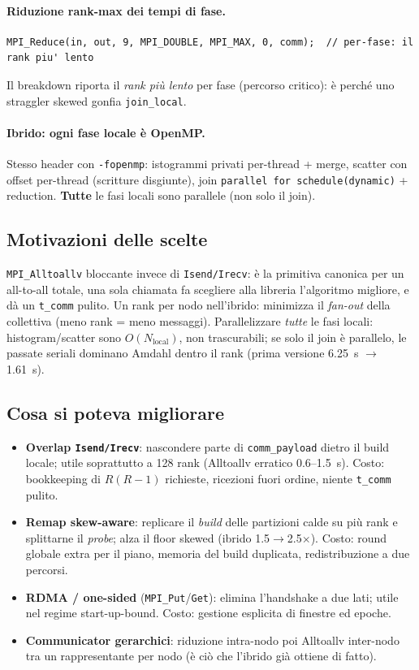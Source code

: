 \documentclass[11pt,a4paper]{article}
\begin{document}
\paragraph{Riduzione rank-max dei tempi di fase.}
\begin{lstlisting}[style=cpp]
MPI_Reduce(in, out, 9, MPI_DOUBLE, MPI_MAX, 0, comm);  // per-fase: il rank piu' lento
\end{lstlisting}
Il breakdown riporta il \emph{rank più lento} per fase (percorso critico): è perché uno straggler skewed gonfia \texttt{join\_local}.

\paragraph{Ibrido: ogni fase locale è OpenMP.} Stesso header con \texttt{-fopenmp}: istogrammi privati per-thread + merge, scatter con offset per-thread (scritture disgiunte), join \texttt{parallel for schedule(dynamic)} + reduction. \textbf{Tutte} le fasi locali sono parallele (non solo il join).

\subsection{Motivazioni delle scelte}

\texttt{MPI\_Alltoallv} bloccante invece di \texttt{Isend/Irecv}: è la primitiva canonica per un all-to-all totale, una sola chiamata fa scegliere alla libreria l'algoritmo migliore, e dà un \texttt{t\_comm} pulito. Un rank per nodo nell'ibrido: minimizza il \emph{fan-out} della collettiva (meno rank = meno messaggi). Parallelizzare \emph{tutte} le fasi locali: histogram/scatter sono $O(N_\text{local})$, non trascurabili; se solo il join è parallelo, le passate seriali dominano Amdahl dentro il rank (prima versione 6.25~s $\to$ 1.61~s).

\subsection{Cosa si poteva migliorare}

\begin{itemize}
  \item \textbf{Overlap \texttt{Isend/Irecv}}: nascondere parte di \texttt{comm\_payload} dietro il build locale; utile soprattutto a 128 rank (Alltoallv erratico 0.6--1.5~s). Costo: bookkeeping di $R(R-1)$ richieste, ricezioni fuori ordine, niente \texttt{t\_comm} pulito.
  \item \textbf{Remap skew-aware}: replicare il \emph{build} delle partizioni calde su più rank e splittarne il \emph{probe}; alza il floor skewed (ibrido 1.5$\to$2.5$\times$). Costo: round globale extra per il piano, memoria del build duplicata, redistribuzione a due percorsi.
  \item \textbf{RDMA / one-sided} (\texttt{MPI\_Put}/\texttt{Get}): elimina l'handshake a due lati; utile nel regime start-up-bound. Costo: gestione esplicita di finestre ed epoche.
  \item \textbf{Communicator gerarchici}: riduzione intra-nodo poi Alltoallv inter-nodo tra un rappresentante per nodo (è ciò che l'ibrido già ottiene di fatto).
\end{itemize}
\end{document}
